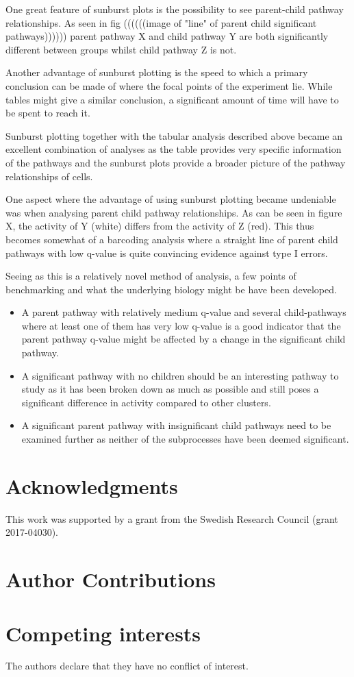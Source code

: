 \documentclass[11pt]{article}
\begin{document}
  One great feature of sunburst plots is the possibility to see parent-child pathway relationships. As seen in fig  ((((((image of "line" of parent child significant pathways)))))) parent pathway X and child pathway Y are both significantly different between groups whilst child pathway Z is not.


  Another advantage of sunburst plotting is the speed to which a primary conclusion can be made of where the focal points of the experiment lie. While tables might give a similar conclusion, a significant amount of time will have to be spent to reach it.

  Sunburst plotting together with the tabular analysis described above became an excellent combination of analyses as the table provides very specific information of the pathways and the sunburst plots provide a broader picture of the pathway relationships of cells.

  One aspect where the advantage of using sunburst plotting became undeniable was when analysing parent child pathway relationships. As can be seen in figure X, the activity of Y (white) differs from the activity of Z (red). This thus becomes somewhat of a barcoding analysis where a straight line of parent child pathways with low q-value is quite convincing evidence against type I errors.

  Seeing as this is a relatively novel method of analysis, a few points of benchmarking and what the underlying biology might be have been developed.

  \begin{itemize}
      \item A parent pathway with relatively medium q-value and several child-pathways where at least one of them has very low q-value is a good indicator that the parent pathway q-value might be affected by a change in the significant child pathway.
      \item A significant pathway with no children should be an interesting pathway to study as it has been broken down as much as possible and still poses a significant difference in activity compared to other clusters.
      \item A significant parent pathway with insignificant child pathways need to be examined further as neither of the subprocesses have been deemed significant.
    \end{itemize}

\section*{Acknowledgments}

This work was supported by a grant from the Swedish Research Council (grant
2017-04030).

\section*{Author Contributions}

\section*{Competing interests}

The authors declare that they have no conflict of interest.

\printbibliography[title=References]
\end{document}
